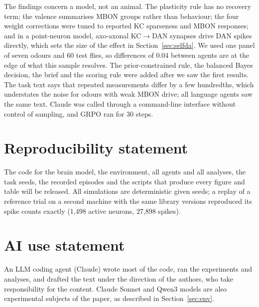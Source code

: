 \documentclass{article}
\begin{document}
The findings concern a model, not an animal. The plasticity rule has no recovery term; the valence summarises MBON groups rather than behaviour; the four weight corrections were tuned to reported KC sparseness and MBON responses; and in a point-neuron model, axo-axonal KC$\rightarrow$DAN synapses drive DAN spikes directly, which sets the size of the effect in Section~\ref{sec:selfda}. We used one panel of seven odours and 60 test flies, so differences of 0.04 between agents are at the edge of what this sample resolves. The prior-constrained rule, the balanced Bayes decision, the brief and the scoring rule were added after we saw the first results. The task text says that repeated measurements differ by a few hundredths, which understates the noise for odours with weak MBON drive; all language agents saw the same text. Claude was called through a command-line interface without control of sampling, and GRPO ran for 30 steps.

\section*{Reproducibility statement}
The code for the brain model, the environment, all agents and all analyses, the task seeds, the recorded episodes and the scripts that produce every figure and table will be released. All simulations are deterministic given seeds; a replay of a reference trial on a second machine with the same library versions reproduced its spike counts exactly (1{,}498 active neurons, 27{,}898 spikes).

\section*{AI use statement}
An LLM coding agent (Claude) wrote most of the code, ran the experiments and analyses, and drafted the text under the direction of the authors, who take responsibility for the content. Claude Sonnet and Qwen3 models are also experimental subjects of the paper, as described in Section~\ref{sec:env}.




\appendix

\end{document}
